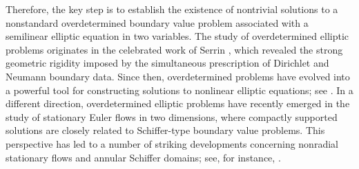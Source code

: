 \documentclass[12pt,reqno]{amsart}
\numberwithin{equation}{section}
\theoremstyle{definition}
\theoremstyle{remark}
\begin{document}
Therefore, the key step is to establish the existence of nontrivial solutions to a nonstandard overdetermined boundary value problem associated with a semilinear elliptic equation in two variables. The study of overdetermined elliptic problems originates in the celebrated work of Serrin \cite{Serrin}, which revealed the strong geometric rigidity imposed by the simultaneous prescription of Dirichlet and Neumann boundary data. Since then, overdetermined problems have evolved into a powerful tool for constructing solutions to nonlinear elliptic equations; see \cite{DelaySicbaldi,DominguezEncisoPeraltaSalas,DominguezVazquezEncisoPeraltaSalas2023,PacardSicbaldi}. %
In a different direction, overdetermined elliptic problems have recently emerged in the study of stationary Euler flows in two dimensions, where compactly supported solutions are closely related to Schiffer-type boundary value problems. This perspective has led to a number of striking developments concerning nonradial stationary flows and annular Schiffer domains; see, for instance, \cite{EncisoFernandezRuizSicbaldi2025,GomezSerranoParkShi2025}.
\end{document}
